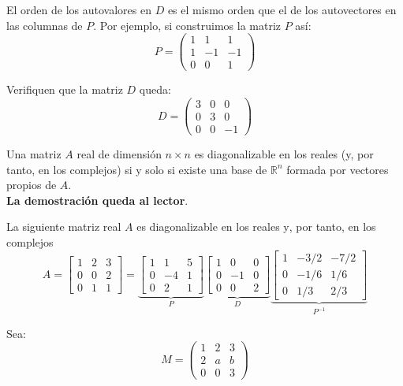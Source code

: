 \begin{}
\begin{example}
El orden de los autovalores en \( D \) es el mismo orden que el de los autovectores en las columnas de \( P \). Por ejemplo, si construimos la matriz \( P \) así:
\[ P = \begin{pmatrix}
1 & 1 & 1 \\
1 & -1 & -1 \\
0 & 0 & 1
\end{pmatrix} \]

Verifiquen que la matriz \( D \) queda:
\[ D = \begin{pmatrix}
3 & 0 & 0 \\
0 & 3 & 0 \\
0 & 0 & -1
\end{pmatrix} \]
   
\end{example}
\begin{tcolorbox}[colback=white!5!white,colframe=red!50!red,title=Teorema]
 Una matriz $A$ real de dimensión $n \times n$  es diagonalizable en los reales (y, por tanto, en los complejos) si y solo si existe una base de $\mathbb{R}^n$ formada por vectores propios de $A$.\\
 \textbf{ La demostración queda al lector}.
\end{tcolorbox}
\begin{example}
 La siguiente matriz real $A$ es diagonalizable en los reales $\mathrm{y}$, por tanto, en los complejos\\
 \begin{equation*}
A=\left[\begin{array}{lll}
1 & 2 & 3 \\
0 & 0 & 2 \\
0 & 1 & 1
\end{array}\right]=\underbrace{\left[\begin{array}{ccc}
1 & 1 & 5 \\
0 & -4 & 1 \\
0 & 2 & 1
\end{array}\right]}_P \underbrace{\left[\begin{array}{ccc}
1 & 0 & 0 \\
0 & -1 & 0 \\
0 & 0 & 2
\end{array}\right]}_D\underbrace{\left[\begin{array}{ccc}
1 & -3 / 2 & -7 / 2 \\
0 & -1 / 6 & 1 / 6 \\
0 & 1 / 3 & 2 / 3
\end{array}\right]}_{P^{-1}}
\end{equation*}
\end{example}
\begin{exercise}
    Sea:
\[ M = \begin{pmatrix}
1 & 2 & 3 \\
2 & a & b \\
0 & 0 & 3
\end{pmatrix} \]


\end{exercise}
\end{}
